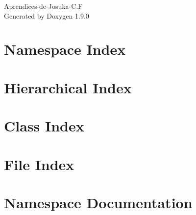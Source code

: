 \let\mypdfximage\pdfximage\def\pdfximage{\immediate\mypdfximage}\documentclass[twoside]{book}
\newcommand{\+}{\discretionary{\mbox{\scriptsize$\hookleftarrow$}}{}{}}
\newcommand{\clearemptydoublepage}{%
  \newpage{\pagestyle{empty}\cleardoublepage}%
}
\begin{document}
\raggedbottom

\hypersetup{pageanchor=false,
             bookmarksnumbered=true,
             pdfencoding=unicode
            }
\begin{titlepage}
\vspace*{7cm}
\begin{center}%
{\Large Aprendices-\/de-\/\+Josuka-\/C.F }\\
\vspace*{1cm}
{\large Generated by Doxygen 1.9.0}\\
\end{center}
\end{titlepage}
\clearemptydoublepage
{}
\tableofcontents
\clearemptydoublepage
{}
\hypersetup{pageanchor=true}

\chapter{Namespace Index}

\chapter{Hierarchical Index}

\chapter{Class Index}

\chapter{File Index}

\chapter{Namespace Documentation}



















\end{document}
